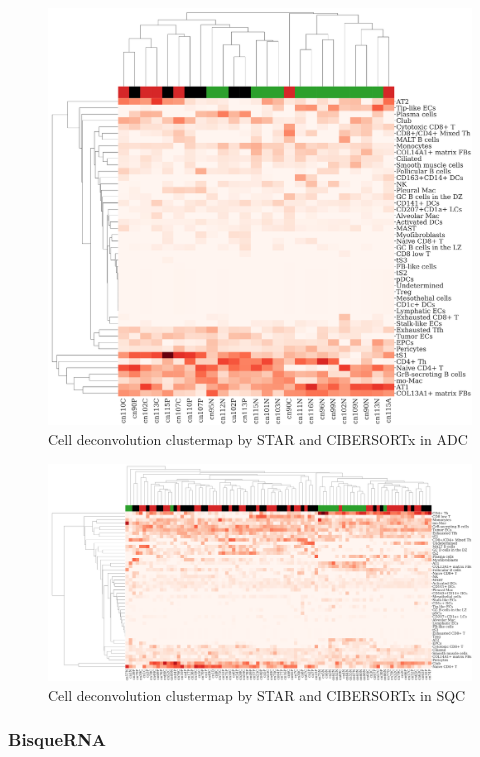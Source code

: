 \documentclass[11pt,a4paper,onecolumn,oneside]{report}
\begin{document}
                \begin{figure}[p]
                    \centering
                    \includegraphics[width=0.6 \linewidth]{figures/CIBERSORTx/clustermap/STAR.ADC.cluster.pdf}
                    \caption{Cell deconvolution clustermap by STAR and CIBERSORTx in ADC}
                    \label{fig:Deconvolution-CIBERSORTx-STAR-cluster-ADC}
                \end{figure}

                \begin{figure}[p]
                    \centering
                    \includegraphics[width=\linewidth]{figures/CIBERSORTx/clustermap/STAR.SQC.cluster.pdf}
                    \caption{Cell deconvolution clustermap by STAR and CIBERSORTx in SQC}
                    \label{fig:Deconvolution-CIBERSORTx-STAR-cluster-SQC}
                \end{figure}

            \subsubsection{BisqueRNA}
\end{document}
